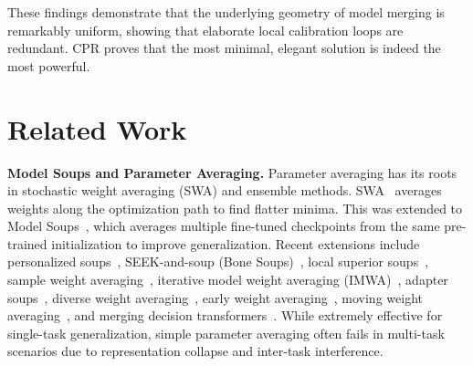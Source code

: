 \documentclass{article}
\theoremstyle{plain}
\theoremstyle{definition}
\theoremstyle{remark}
\begin{document}
These findings demonstrate that the underlying geometry of model merging is remarkably uniform, showing that elaborate local calibration loops are redundant. CPR proves that the most minimal, elegant solution is indeed the most powerful.

\section{Related Work}
\label{sec:related}

\textbf{Model Soups and Parameter Averaging.}
Parameter averaging has its roots in stochastic weight averaging (SWA) and ensemble methods. SWA~\cite{FedswaImprovingGeneralization2025, GaussianStochasticWeight2024, AdaptiveStochasticWeight2024, RevisitingWeightAveraging2024} averages weights along the optimization path to find flatter minima. This was extended to Model Soups~\cite{Wortsman2022Soups}, which averages multiple fine-tuned checkpoints from the same pre-trained initialization to improve generalization. Recent extensions include personalized soups~\cite{PersonalizedSoupsPersonalized2023}, SEEK-and-soup (Bone Soups)~\cite{BoneSoupsA2025}, local superior soups~\cite{LocalSuperiorSoups2024}, sample weight averaging~\cite{SampleWeightAveraging2025}, iterative model weight averaging (IMWA)~\cite{ImwaIterativeModel2024}, adapter soups~\cite{AdaptersoupWeightAveraging2023}, diverse weight averaging~\cite{DiverseWeightAveraging2022}, early weight averaging~\cite{EarlyWeightAveraging2023}, moving weight averaging~\cite{HsicbasedMovingWeight2023}, and merging decision transformers~\cite{MergingDecisionTransformers2023}. While extremely effective for single-task generalization, simple parameter averaging often fails in multi-task scenarios due to representation collapse and inter-task interference.
\end{document}
